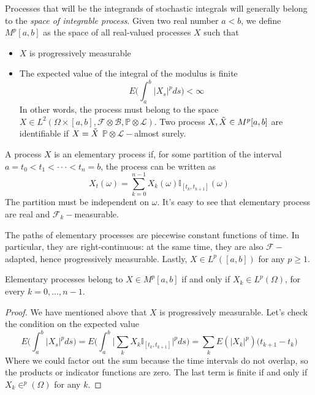 \begin{definition}
    Processes that will be the integrands of stochastic integrals will generally belong to the \textit{space of integrable process}. Given two real number $a < b$, we define $M^p[a,b]$ as the space of all real-valued processes $X$ such that
    \begin{itemize}
        \item $X$ is progressively measurable
        \item The expected value of the integral of the modulus is finite
        \begin{equation*}
            E\Bigg( \int_a^b \vert X_s \vert^p ds \Bigg) < \infty
        \end{equation*}
        In other words, the process must belong to the space $X \in L^2(\Omega \times [a,b], \mathcal{F} \otimes \mathcal{B}, \mathbb{P} \otimes \mathcal{L})$. Two process $X,\Tilde{X} \in M^p[a,b]$ are identifiable if $X = \Tilde{X}$ $\mathbb{P}\otimes \mathcal{L}-$almost surely.  
    \end{itemize}
\end{definition}

\begin{definition}
    A process $X$ is an elementary process if, for some partition of the interval $a = t_0 < t_1 < \cdot\cdot\cdot < t_n = b$,  the process can be written as 
    \begin{equation*}
        X_t(\omega) = \sum_{k=0}^{n-1} X_k(\omega) \mathbb{I}_{[t_k, t_{k+1}]}(\omega)
    \end{equation*}
    The partition must be independent on $\omega$. It's easy to see that elementary process are real and $\mathcal{F}_k-$measurable. 
\end{definition}

The paths of elementary processes are piecewise constant functions of time. In particular, they are right-continuous: at the same time, they are also $\mathcal{F}-$adapted, hence progressively measurable. Lastly, $X \in L^p([a,b])$ for any $p \geq 1$. 

\begin{proposition}
    Elementary processes belong to $X \in M^p[a,b]$ if and only if $X_k \in L^p(\Omega)$, for every $k = 0,...,n-1$. 
\end{proposition}
\begin{proof}
    We have mentioned above that $X$ is progressively measurable. Let's check the condition on the expected value
    \begin{equation*}
        E\Bigg( \int_a^b \vert X_s \vert^p ds \Bigg) = E\Bigg( \int_a^b \Big\vert \sum_k X_k \mathbb{I}_{[t_k,t_{k+1}]} \Big\vert^p ds \Bigg) = \sum_k E(\vert X_k \vert^p) \big( t_{k+1}-t_k \big)  
    \end{equation*}
    Where we could factor out the sum because the time intervals do not overlap, so the products or indicator functions are zero. The last term is finite if and only if $X_k \in ^p(\Omega)$ for any $k$. 
\end{proof}

